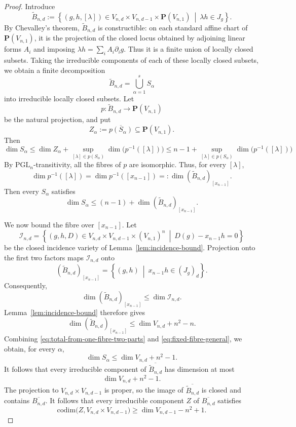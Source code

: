 \documentclass[a4paper,12pt,twoside,reqno]{amsart}
\numberwithin{equation}{section}
\theoremstyle{plain}
\theoremstyle{definition}
\newcommand{\PP}{\mathbf{P}}
\newcommand{\codim}{\mathrm{codim}}
\theoremstyle{plain}
\theoremstyle{definition}
\begin{document}
\begin{proof}
Introduce
\[
\widetilde B_{n,d}:=
\left\{
(g,h,[\lambda])
\in V_{n,d}\times V_{n,d-1}\times\PP(V_{n,1})
\ \middle|\ \lambda h\in J_g
\right\}.
\]
By Chevalley's theorem, $\widetilde B_{n,d}$ is constructible: on each standard affine chart of $\PP(V_{n,1})$, it is the projection of the closed locus obtained by adjoining linear forms $A_i$ and imposing $\lambda h=\sum_i A_i\partial_i g$. Thus it is a finite union of
locally closed subsets. Taking the irreducible components of each of
these locally closed subsets, we obtain a finite decomposition
\[
\widetilde B_{n,d}=\bigcup_{\alpha=1}^s S_\alpha
\]
into irreducible locally closed subsets. Let
\[
p\colon\widetilde B_{n,d}\longrightarrow\PP(V_{n,1})
\]
be the natural projection, and put
\[
Z_\alpha:=\overline{p(S_\alpha)}
\subseteq\PP(V_{n,1}).
\]
Then
\[
\dim S_\alpha
\le \dim Z_\alpha+
  \sup_{[\lambda]\in p(S_\alpha)}
  \dim\bigl( p^{-1}([\lambda])\bigr) \leq n-1 +  \sup_{[\lambda]\in p(S_\alpha)}
  \dim\bigl( p^{-1}([\lambda])\bigr) 
\]
By $\mathrm{PGL}_n$-transitivity, all the fibres
of \(p\) are isomorphic. Thus, for every \([\lambda]\),
\[
\dim p^{-1}([\lambda])
=\dim p^{-1}([x_{n-1}])
=:\dim(\widetilde B_{n,d})_{[x_{n-1}]}.
\]
Then every \(S_\alpha\) satisfies
\[
\dim S_\alpha
\le(n-1)+\dim(\widetilde B_{n,d})_{[x_{n-1}]}.
\tag{11}\label{eq:total-from-one-fibre-two-parts}
\]

We now bound the fibre over \([x_{n-1}]\). Let
\[
\mathcal I_{n,d}=
\left\{
(g,h,D)\in
V_{n,d}\times V_{n,d-1}\times(V_{n,1})^n
\ \middle|\ D(g)-x_{n-1}h=0
\right\}
\]
be the closed incidence variety of Lemma~\ref{lem:incidence-bound}.
Projection onto the first two factors maps \(\mathcal I_{n,d}\) onto
\[
(\widetilde B_{n,d})_{[x_{n-1}]}
=
\left\{
(g,h)\ \middle|\ x_{n-1}h\in(J_g)_d
\right\}.
\]
Consequently,
\[
\dim(\widetilde B_{n,d})_{[x_{n-1}]}
\le\dim\mathcal I_{n,d}.
\tag{12}\label{eq:projection-I-two-parts}
\]
Lemma~\ref{lem:incidence-bound} therefore gives
\[
\dim(\widetilde B_{n,d})_{[x_{n-1}]}
\le\dim V_{n,d}+n^2-n.
\tag{13}\label{eq:fixed-fibre-general}
\]
Combining \eqref{eq:total-from-one-fibre-two-parts} and
\eqref{eq:fixed-fibre-general}, we obtain, for every \(\alpha\),
\[
\dim S_\alpha\le\dim V_{n,d}+n^2-1.
\]
It follows  that every
irreducible component of \(\overline{\widetilde B_{n,d}}\) has dimension
at most
\[
\dim V_{n,d}+n^2-1.
\]
The projection to $V_{n,d}\times V_{n,d-1}$ is proper, so the image of $\overline{\widetilde B_{n,d}}$ is closed and contains $\overline{B_{n,d}}$. It follows that every irreducible component $Z$ of $\overline{B_{n,d}}$ satisfies
\[
\codim\bigl(Z,V_{n,d}\times V_{n,d-1}\bigr)
\ge\dim V_{n,d-1}-n^2+1.
\tag{17}\label{eq:component-bound-two-parts}
\]


\end{proof}
\end{document}
